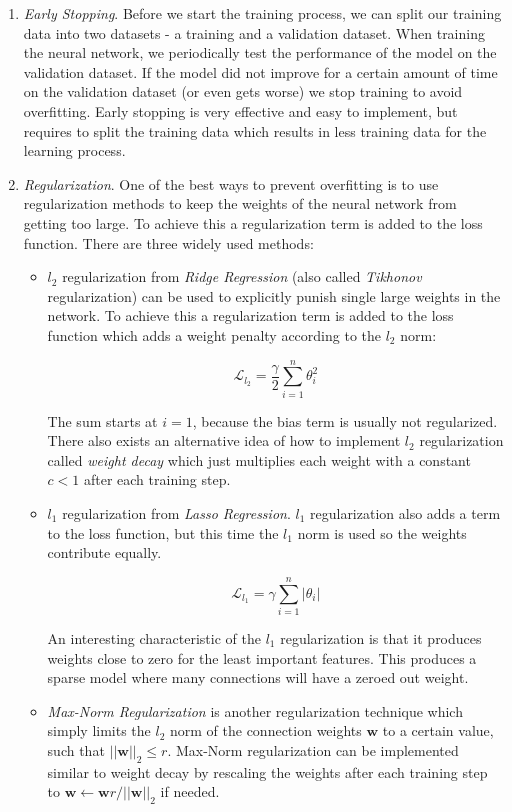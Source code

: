 \begin{enumerate}
  \item \textit{Early Stopping}. Before we start the training process, we can split our training data into two datasets - a training and a validation dataset. When training the neural network, we periodically test the performance of the model on the validation dataset. If the model did not improve for a certain amount of time on the validation dataset (or even gets worse) we stop training to avoid overfitting. Early stopping is very effective and easy to implement, but requires to split the training data which results in less training data for the learning process.  
  \item \textit{Regularization}. One of the best ways to prevent overfitting is to use regularization methods to keep the weights of the neural network from getting too large. To achieve this a regularization term is added to the loss function. There are three widely used methods:
  \begin{itemize}
    \item $l_2$ regularization from \textit{Ridge Regression} (also called \textit{Tikhonov} regularization) can be used to explicitly punish single large weights in the network. To achieve this a regularization term is added to the loss function which adds a weight penalty according to the $l_2$ norm:

      \[\mathcal{L}_{l_2} = \frac{\gamma}{2} \sum_{i=1}^n \theta^2_i \]

      The sum starts at $i=1$, because the bias term is usually not regularized. There also exists an alternative idea of how to implement $l_2$ regularization called \textit{weight decay} which just multiplies each weight with a constant $c < 1$ after each training step.
    
    \item $l_1$ regularization from \textit{Lasso Regression}. $l_1$ regularization also adds a term to the loss function, but this time the $l_1$ norm is used so the weights contribute equally. 

      \[\mathcal{L}_{l_1} = \gamma \sum_{i=1}^n |\theta_i| \]

      An interesting characteristic of the $l_1$ regularization is that it produces weights close to zero for the least important features. This produces a sparse model where many connections will have a zeroed out weight.
    
    \item \textit{Max-Norm Regularization} is another regularization technique which simply limits the $l_2$ norm of the connection weights $\mathbf{w}$ to a certain value, such that $|| \mathbf{w} ||_2 \leq r$. Max-Norm regularization can be implemented similar to weight decay by rescaling the weights after each training step to $\mathbf{w} \leftarrow \mathbf{w} r/||\mathbf{w}||_2$ if needed. 


\end{itemize}
\end{enumerate}
